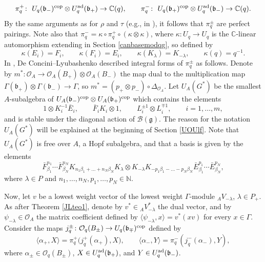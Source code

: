\documentclass[pdftex]{sigma}
\numberwithin{equation}{section}
\theoremstyle{definition}
\newcommand{\mc}{\mathbb{C}}
\newcommand{\Oo}{{\mathcal O}}
\newcommand{\ra}{\rightarrow}
\begin{document}
\[\pi^{+}_q\colon\ U_q(\mathfrak{b}_-)^{\rm cop}\otimes U_q^{\rm ad}(\mathfrak{b}_+)\ra \mc(q),\qquad \pi^-_q\colon\ U_q(\mathfrak{b}_+)^{\rm cop}\otimes U_q^{\rm ad}(\mathfrak{b}_-)\ra \mc(q).\]
By the same arguments as for $\rho$ and $\tau$ (e.g., in \cite[Proposition 3.92]{VY}), it follows that $\pi^{\pm}_q$ are perfect pairings. Note also that $\pi^-_q =\kappa \circ \pi^+_q\circ (\kappa\otimes \kappa)$, where $\kappa\colon U_q \ra U_q$ is the $\mc$-linear automorphism extending \smash{${}^-\colon U_q^{\rm ad} \ra U_q^{\rm ad}$} in Section \ref{canbasemodqg}, so defined by
\begin{equation}\label{kappadef}
\kappa(E_i) = F_i,\qquad\kappa(F_i) = E_i,\qquad \kappa(K_\lambda) = K_{-\lambda},\qquad \kappa(q) = q^{-1}.
\end{equation}
In \cite{DC-L}, De Concini--Lyubashenko described integral forms of $\pi_q^\pm$ as follows. Denote by $m^*\colon \Oo_A\ra \Oo_A(B_+)\otimes \Oo_A(B_-)$ the map dual to the multiplication map $\Gamma(\mathfrak{b}_+)\otimes \Gamma(\mathfrak{b}_-)\ra \Gamma$, so $m^* = (p_+ \otimes p_-)\circ \Delta_{\Oo_A}$. Let $U_A(G^*)$ be the smallest $A$-subalgebra of $U_A(\mathfrak{b}_-)^{\rm cop}\otimes U_A(\mathfrak{b}_+)^{\rm cop}$ which contains the elements
\[1\otimes K_i^{-1}\bar{E}_i,\qquad \bar{F}_iK_i\otimes 1,\qquad L_i^{\pm 1}\otimes L_i^{\mp 1}, \qquad i=1,\dots,m,\]
and is stable under the diagonal action of $\mathcal{B}(\mathfrak{g})$. The reason for the notation $U_A(G^*)$ will be explained at the beginning of Section \ref{UOUlf}. Note that $U_A(G^*)$ is free over $A$, a Hopf subalgebra, and that a basis is given by the elements
\begin{equation}\label{basiselmt}
\bar{F}_{\beta_1}^{n_1}\cdots \bar{F}_{\beta_N}^{n_N}K_{n_1\beta_1+\dots+ n_N \beta_N}K_{\lambda}
\otimes K_{-\lambda}K_{-p_1\beta_1-\dots- p_N \beta_N}\bar{E}_{\beta_1}^{p_1}\cdots \bar{E}_{\beta_N}^{p_N},
\end{equation}
where $\lambda\in P$ and $n_1,\dots ,n_N, p_1,\dots ,p_N \in {\mathbb N}$.

Now, let $v$ be a lowest weight vector of the lowest weight $\Gamma$-module ${}_AV_{-\lambda}$, $\lambda \in P_+$. As after Theorem \ref{JLteo1}, denote by $v^*\in {}_AV_{-\lambda}^*$ the dual vector, and by $\psi_{-\lambda}\in \Oo_A$ the matrix coefficient defined by $\langle \psi_{-\lambda},x\rangle = v^*(xv)$ for every $x\in \Gamma$. Consider the maps $j_q^\pm\colon \Oo_q(B_\pm) \ra U_q(\mathfrak{b}_\mp)^{\rm cop}$ defined by
\[
\langle \alpha_+,X\rangle = \pi_q^+\big(j_q^+(\alpha_+),X\big),\qquad \langle \alpha_-,Y\rangle = \pi_q^-(j_q^-(\alpha_-),Y),
\]
where $\alpha_\pm\in \Oo_q(B_\pm)$, $X\in U_q^{\rm ad}(\mathfrak{b}_+)$, and $Y\in U_q^{\rm ad}(\mathfrak{b}_-)$.
\end{document}
